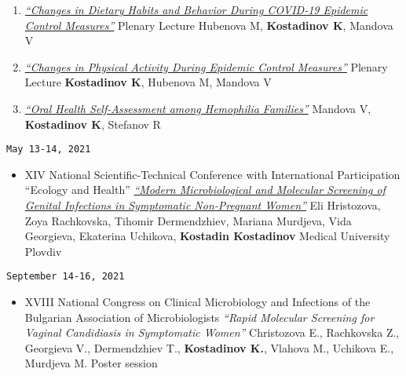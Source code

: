 \documentclass[
  12pt,
  letterpaper,
  DIV=11,
  numbers=noendperiod]{scrartcl}
\providecommand{\tightlist}{%
  \setlength{\itemsep}{0pt}\setlength{\parskip}{0pt}}\usepackage{longtable,booktabs,array}
\begin{document}
\begin{enumerate}
\def\labelenumi{\arabic{enumi}.}
\item
  \href{https://www.asclepius.bg/images/nm2021/\%D0\%9F\%D0\%A0\%D0\%9E\%D0\%93\%D0\%A0\%D0\%90\%D0\%9C\%D0\%90-\%D0\%9D\%D0\%90\%D0\%A3\%D0\%9A\%D0\%90-\%D0\%98-\%D0\%9C\%D0\%9B\%D0\%90\%D0\%94\%D0\%9E\%D0\%A1\%D0\%A2-2021.pdf}{\emph{``Changes
  in Dietary Habits and Behavior During COVID-19 Epidemic Control
  Measures''}} \textbar{} Plenary Lecture \textbar{} Hubenova M,
  \textbf{Kostadinov K}, Mandova V
\item
  \href{https://www.asclepius.bg/images/nm2021/\%D0\%9F\%D0\%A0\%D0\%9E\%D0\%93\%D0\%A0\%D0\%90\%D0\%9C\%D0\%90-\%D0\%9D\%D0\%90\%D0\%A3\%D0\%9A\%D0\%90-\%D0\%98-\%D0\%9C\%D0\%9B\%D0\%90\%D0\%94\%D0\%9E\%D0\%A1\%D0\%A2-2021.pdf}{\emph{``Changes
  in Physical Activity During Epidemic Control Measures''}} \textbar{}
  Plenary Lecture \textbar{} \textbf{Kostadinov K}, Hubenova M, Mandova
  V
\item
  \href{https://asclepius.bg/cnm/wp-content/uploads/2022/05/Sbornik-Nauka-i-Mladost-2021.pdf}{\emph{``Oral
  Health Self-Assessment among Hemophilia Families''}} \textbar{}
  Mandova V, \textbf{Kostadinov K}, Stefanov R
\end{enumerate}

\texttt{May\ 13-14,\ 2021}

\begin{itemize}
\tightlist
\item
  XIV National Scientific-Technical Conference with International
  Participation ``Ecology and Health'' \textbar{}
  \href{https://hst.bg/ECOLOGY\%20AND\%20HEALTH\%202021.pdf}{\emph{``Modern
  Microbiological and Molecular Screening of Genital Infections in
  Symptomatic Non-Pregnant Women''}} \textbar{} Eli Hristozova, Zoya
  Rachkovska, Tihomir Dermendzhiev, Mariana Murdjeva, Vida Georgieva,
  Ekaterina Uchikova, \textbf{Kostadin Kostadinov} \textbar{} Medical
  University Plovdiv
\end{itemize}

\texttt{September\ 14-16,\ 2021}

\begin{itemize}
\tightlist
\item
  XVIII National Congress on Clinical Microbiology and Infections of the
  Bulgarian Association of Microbiologists \textbar{} \emph{``Rapid
  Molecular Screening for Vaginal Candidiasis in Symptomatic Women''}
  \textbar{} Christozova E., Rachkovska Z., Georgieva V., Dermendzhiev
  T., \textbf{Kostadinov K.}, Vlahova M., Uchikova E., Murdjeva M.
  \textbar{} Poster session
\end{itemize}
\end{document}
